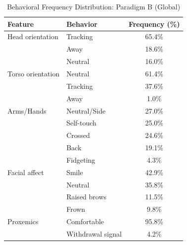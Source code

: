 \begin{table}[ht]
\centering
\caption{Behavioral Frequency Distribution: Paradigm B (Global)}
\begin{tabular}{llc}
\toprule
Feature & Behavior & Frequency (\%) \\
\midrule
Head orientation & Tracking & 65.4\% \\
 & Away & 18.6\% \\
 & Neutral & 16.0\% \\
Torso orientation & Neutral & 61.4\% \\
 & Tracking & 37.6\% \\
 & Away & 1.0\% \\
Arms/Hands & Neutral/Side & 27.0\% \\
 & Self-touch & 25.0\% \\
 & Crossed & 24.6\% \\
 & Back & 19.1\% \\
 & Fidgeting & 4.3\% \\
Facial affect & Smile & 42.9\% \\
 & Neutral & 35.8\% \\
 & Raised brows & 11.5\% \\
 & Frown & 9.8\% \\
Proxemics & Comfortable & 95.8\% \\
 & Withdrawal signal & 4.2\% \\
\bottomrule
\end{tabular}
\end{table}